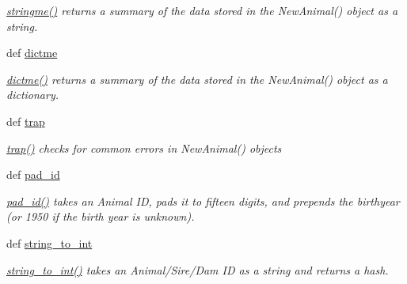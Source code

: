 \begin{DoxyCompactItemize}
\begin{DoxyCompactList}\small\item\em \hyperlink{classPyPedal_1_1pyp__newclasses_1_1NewAnimal_ab2618a6a1bf2fac243a19799e60b5195}{stringme()} returns a summary of the data stored in the NewAnimal() object as a string. \item\end{DoxyCompactList}\item 
def \hyperlink{classPyPedal_1_1pyp__newclasses_1_1NewAnimal_af44ae249e4d1bada4a80357328f2b66d}{dictme}
\begin{DoxyCompactList}\small\item\em \hyperlink{classPyPedal_1_1pyp__newclasses_1_1NewAnimal_af44ae249e4d1bada4a80357328f2b66d}{dictme()} returns a summary of the data stored in the NewAnimal() object as a dictionary. \item\end{DoxyCompactList}\item 
def \hyperlink{classPyPedal_1_1pyp__newclasses_1_1NewAnimal_a7e0f99289cd0d36e391d3f0655bbd694}{trap}
\begin{DoxyCompactList}\small\item\em \hyperlink{classPyPedal_1_1pyp__newclasses_1_1NewAnimal_a7e0f99289cd0d36e391d3f0655bbd694}{trap()} checks for common errors in NewAnimal() objects \item\end{DoxyCompactList}\item 
def \hyperlink{classPyPedal_1_1pyp__newclasses_1_1NewAnimal_afc05804f6dd528ab5bf0b8a39e543ce9}{pad\_\-id}
\begin{DoxyCompactList}\small\item\em \hyperlink{classPyPedal_1_1pyp__newclasses_1_1NewAnimal_afc05804f6dd528ab5bf0b8a39e543ce9}{pad\_\-id()} takes an Animal ID, pads it to fifteen digits, and prepends the birthyear (or 1950 if the birth year is unknown). \item\end{DoxyCompactList}\item 
def \hyperlink{classPyPedal_1_1pyp__newclasses_1_1NewAnimal_a1ca64b46fb81306492bf8a93a46f3ace}{string\_\-to\_\-int}
\begin{DoxyCompactList}\small\item\em \hyperlink{classPyPedal_1_1pyp__newclasses_1_1NewAnimal_a1ca64b46fb81306492bf8a93a46f3ace}{string\_\-to\_\-int()} takes an Animal/Sire/Dam ID as a string and returns a hash. \item\end{DoxyCompactList}\end{DoxyCompactItemize}

